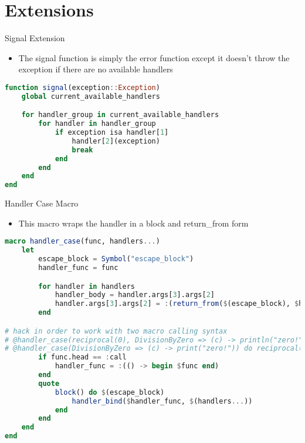 \documentclass{beamer}
\begin{document}
\section{Extensions}
\begin{frame}[fragile,t]{Signal Extension}

\begin{itemize}
    \item The signal function is simply the error function except it doesn't throw the exception if there are no available handlers
\end{itemize}
\vfill
\begin{lstlisting}[language=julia, style=jlcodestyle]
function signal(exception::Exception)
    global current_available_handlers

    for handler_group in current_available_handlers
        for handler in handler_group
            if exception isa handler[1]
                handler[2](exception)
                break
            end
        end
    end
end
\end{lstlisting}
\end{frame}

\begin{frame}[fragile,t]{Handler Case Macro}

\begin{itemize}
    \item This macro wraps the handler in a block and return\_from form
\end{itemize}
\vfill
\begin{lstlisting}[language=julia, style=jlcodestyle,]
macro handler_case(func, handlers...)
    let
        escape_block = Symbol("escape_block")
        handler_func = func

        for handler in handlers
            handler_body = handler.args[3].args[2]
            handler.args[3].args[2] = :(return_from($(escape_block), $handler_body))
        end

# hack in order to work with two macro calling syntax
# @handler_case(reciprocal(0), DivisionByZero => (c) -> println("zero!"))
# @handler_case(DivisionByZero => (c) -> print("zero!")) do reciprocal(0) end
        if func.head == :call
            handler_func = :(() -> begin $func end)
        end
        quote
            block() do $(escape_block)
                handler_bind($handler_func, $(handlers...))
            end
        end
    end
end

\end{lstlisting}
\end{frame}
\end{document}
